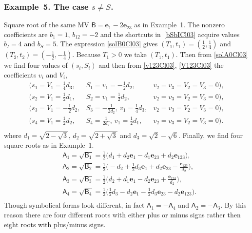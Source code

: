 \documentclass{birkjour}
\newcommand{\e}[1]{\mathbf{e}_{#1}} %
\def\A{\mathsf{A}}
\def\B{\mathsf{B}}
\def\e#1{\mathbf{e}_{#1}} %
\begin{document}
\subsubsection*{Example~5. The case $s\ne S$.}
Square root of the same MV $\B=\e{1}-2 \e{23}$ as in Example~1.
The nonzero coefficients are $b_1=1$, $b_{12}=-2$ and the
shortcuts in~\eqref{bSbICl03} acquire values $b_I=4$ and $b_S=5$.
The expression \eqref{solB0Cl03} gives $(T_{1},t_{1})=
(\tfrac{1}{2},\tfrac{1}{4})$ and $(T_{2},t_{2})=
(-\tfrac{1}{2},-\tfrac{1}{4})$. Because $T_1>0$ we take
$(T_{1},t_{1})$. Then from \eqref{solA0Cl03} we find four values
of $(s_i,S_i)$ and then from \eqref{v123Cl03}, \eqref{V123Cl03}
the coefficients $v_i$ and $V_i$,
\begin{equation}\label{ex1aCl03}
\begin{array}{lll}
\big(s_1=V_1=\tfrac{1}{4}d_3,&S_1=v_1=-\tfrac{1}{2}d_2,&v_2=v_3=V_2=V_3=0\big),\\
\big(s_2=V_1=\tfrac{1}{2}d_1,&S_2= v_1=\tfrac{1}{2}d_2,&v_2=v_3=V_2=V_3=0\big),\\
\big(s_3=V_1=-\tfrac{1}{2}  d_2,&S_3=-\tfrac{1}{2 d_2},\ v_1=\tfrac{1}{4}d_3,&v_2=v_3=V_2=V_3=0\big),\\
\big(s_4= V_1=\tfrac{1}{2}d_2,&S_4=\tfrac{1}{2d_2},\ v_1=\tfrac{1}{2}d_1,& v_2=v_3=V_2=V_3=0\big).\\
\end{array}
\end{equation}
where $d_1=\sqrt{2-\sqrt{3}}$,  $d_2=\sqrt{2+\sqrt{3}}$ and
$d_3=\sqrt{2}-\sqrt{6}$. Finally, we find four square roots as in
Example~1.
\begin{equation}\begin{split}\label{ex1AnsCl03}
 &\A_{1}=\sqrt{\B_{1}}=\tfrac{1}{2}\big(d_1+d_2 \e{1}-d_1 \e{23}+ d_2\e{1 2 3}\big),\\
 &\A_{2}=\sqrt{\B_{2}}=\tfrac{1}{2}\big(-d_2+ \tfrac{1}{2}d_3\e{1}+d_2\e{2 3} -\frac{\e{1 2 3}}{d_2}\big),\\
 &\A_{3}=\sqrt{\B_{3}}=\tfrac{1}{2}\big(d_2+ d_1\e{1}-d_2\e{2 3}+\frac{\e{123}}{d_2}\big),\\
 &\A_{4}=\sqrt{\B_{4}}=\tfrac{1}{2}\big(\tfrac{1}{2}d_3-d_2\e{1}-\tfrac{1}{2}d_3 \e{23} -d_2\e{1 2 3}\big).\\
\end{split}\end{equation}
Though symbolical forms look different, in fact $\A_{1}=-\A_{4}$
and $\A_{2}=-\A_{3}$. By this reason there are four
different roots with either plus or minus signs rather then eight
roots with plus/minus signs.
\end{document}
